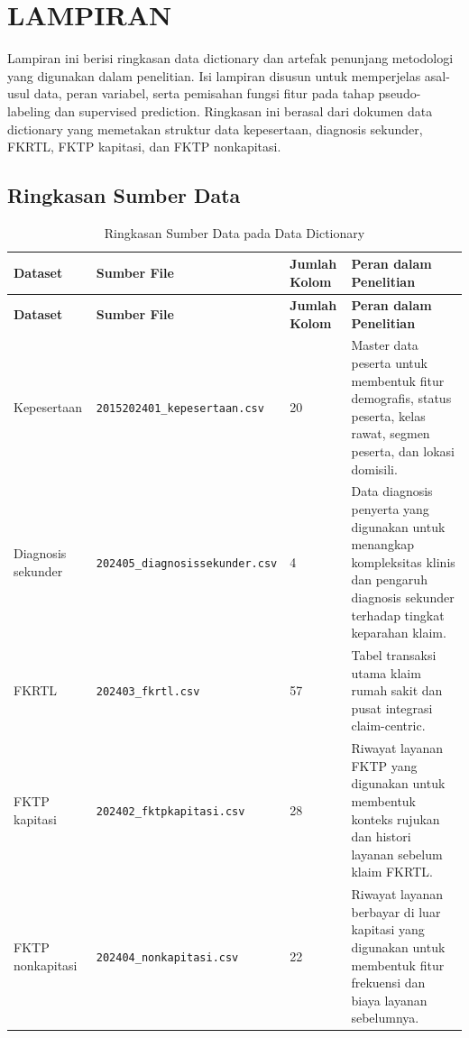 \cleardoublepage
\appendix
{}

\chapter*{LAMPIRAN}
\renewcommand{\thesection}{\Alph{section}}

Lampiran ini berisi ringkasan data dictionary dan artefak penunjang metodologi yang digunakan dalam penelitian. Isi lampiran disusun untuk memperjelas asal-usul data, peran variabel, serta pemisahan fungsi fitur pada tahap pseudo-labeling dan supervised prediction. Ringkasan ini berasal dari dokumen data dictionary yang memetakan struktur data kepesertaan, diagnosis sekunder, FKRTL, FKTP kapitasi, dan FKTP nonkapitasi.

\section{Ringkasan Sumber Data}

\begin{longtable}[]{@{}p{}p{}p{}p{}@{}}
\caption{Ringkasan Sumber Data pada Data Dictionary}\label{tab:lampiran-sumber-data}\\
\toprule
\textbf{Dataset} & \textbf{Sumber File} & \textbf{Jumlah Kolom} & \textbf{Peran dalam Penelitian} \\
\midrule
\endfirsthead
\toprule
\textbf{Dataset} & \textbf{Sumber File} & \textbf{Jumlah Kolom} & \textbf{Peran dalam Penelitian} \\
\midrule
\endhead
\bottomrule
\endfoot
Kepesertaan & \texttt{2015202401\_kepesertaan.csv} & 20 & Master data peserta untuk membentuk fitur demografis, status peserta, kelas rawat, segmen peserta, dan lokasi domisili. \\
Diagnosis sekunder & \texttt{202405\_diagnosissekunder.csv} & 4 & Data diagnosis penyerta yang digunakan untuk menangkap kompleksitas klinis dan pengaruh diagnosis sekunder terhadap tingkat keparahan klaim. \\
FKRTL & \texttt{202403\_fkrtl.csv} & 57 & Tabel transaksi utama klaim rumah sakit dan pusat integrasi claim-centric. \\
FKTP kapitasi & \texttt{202402\_fktpkapitasi.csv} & 28 & Riwayat layanan FKTP yang digunakan untuk membentuk konteks rujukan dan histori layanan sebelum klaim FKRTL. \\
FKTP nonkapitasi & \texttt{202404\_nonkapitasi.csv} & 22 & Riwayat layanan berbayar di luar kapitasi yang digunakan untuk membentuk fitur frekuensi dan biaya layanan sebelumnya. \\
\end{longtable}

